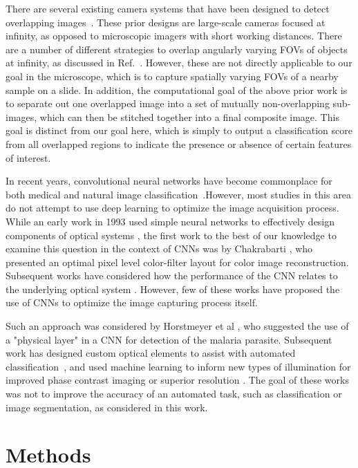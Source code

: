 \documentclass{article}
\begin{document}
There are several existing camera systems that have been designed to detect overlapping images~\cite{Marcia08,Treeaporn10, Horisaki10,Shepard15}. These prior designs are large-scale cameras focused at infinity, as opposed to microscopic imagers with short working distances. There are a number of different strategies to overlap angularly varying FOVs of objects at infinity, as discussed in Ref.~\cite{Shepard15}. However, these are not directly applicable to our goal in the microscope, which is to capture  spatially varying FOVs of a nearby sample on a slide. In addition, the computational goal of the above prior work is to separate out one overlapped image into a set of mutually non-overlapping sub-images, which can then be stitched together into a final composite image. This goal is distinct from our goal here, which is simply to output a classification score from all overlapped regions to indicate the presence or absence of certain features of interest.

In recent years, convolutional neural networks have become commonplace for both medical and natural image classification~\cite{geert}.However, most studies in this area do not attempt to use deep learning to optimize the image acquisition process. While an early work in 1993 used simple neural networks to effectively design components of optical systems \cite{macd}, the first work to the best of our knowledge to examine this question in the context of CNNs was by Chakrabarti \cite{chakrabarti}, who presented an optimal pixel level color-filter layout for color image reconstruction. Subsequent works have considered how the performance of the CNN relates to the underlying optical system \cite{dirty pixels,recon}. However, few of these works have proposed the use of CNNs to optimize the image capturing process itself.

Such an approach was considered by Horstmeyer et al \cite{Horstmeyer17}, who suggested the use of a "physical layer" in a CNN for detection of the malaria parasite. Subsequent work has designed custom optical elements to assist with automated classification~\cite{gordon}, and used machine learning to inform new types of illumination for improved phase contrast imaging \cite{waller,rainer} or superior resolution \cite{ganapati,zheng}. The goal of these works was not to improve the accuracy of an automated task, such as classification or image segmentation, as considered in this work.

\section{Methods}
\end{document}
